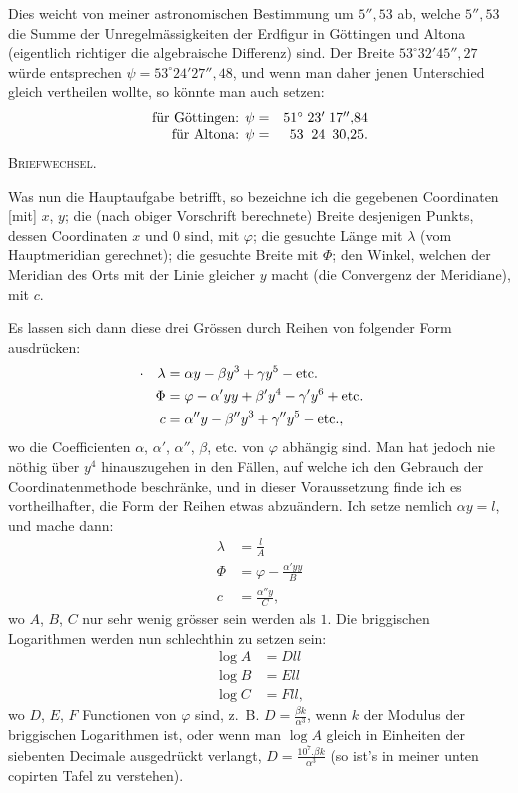 Dies weicht von meiner astronomischen Bestimmung um $5''{,}53$ ab, welche $5''{,}53$ die Summe der Unregelmässigkeiten der Erdfigur in Göttingen und Altona (eigentlich richtiger die algebraische Differenz) sind. Der Breite $53^\circ32'45''{,}27$ würde entsprechen $\psi=53^\circ24'27''{,}48$, und wenn man daher jenen Unterschied gleich vertheilen wollte, so könnte man auch setzen:
\[
\begin{array}{r@{\quad}r@{\;}r@{\;}r}
\text{für Göttingen: }\psi=&51^\circ&23'&17''{,}84\\
\text{für Altona: }\psi=&53&24&30{,}25.
\end{array}
\]
\clearpage
{}\hfill\textsc{Briefwechsel.}\hfill\mbox{}\par\medskip
Was nun die Hauptaufgabe betrifft, so bezeichne ich die gegebenen Coordinaten [mit] $x$, $y$; die (nach obiger Vorschrift berechnete) Breite desjenigen Punkts, dessen Coordinaten $x$ und $0$ sind, mit $\varphi$; die gesuchte Länge mit $\lambda$ (vom Hauptmeridian gerechnet); die gesuchte Breite mit $\Phi$; den Winkel, welchen der Meridian des Orts mit der Linie gleicher $y$ macht (die Convergenz der Meridiane), mit $c$.

Es lassen sich dann diese drei Grössen durch Reihen von folgender Form ausdrücken:
\[
\begin{aligned}
\llap{\text{\raisebox{.45ex}{.}\hspace{1em}}}\lambda&=\alpha y-\beta y^3+\gamma y^5-\text{etc.}\\
\Phi&=\varphi-\alpha'yy+\beta'y^4-\gamma'y^6+\text{etc.}\\
c&=\alpha''y-\beta''y^3+\gamma''y^5-\text{etc.},
\end{aligned}
\]
wo die Coefficienten $\alpha$, $\alpha'$, $\alpha''$, $\beta$, etc. von $\varphi$ abhängig sind. Man hat jedoch nie nöthig über $y^4$ hinauszugehen in den Fällen, auf welche ich den Gebrauch der Coordinatenmethode beschränke, und in dieser Voraussetzung finde ich es vortheilhafter, die Form der Reihen etwas abzuändern. Ich setze nemlich $\alpha y=l$, und mache dann:
\[
\begin{aligned}
\lambda&=\frac lA\\
\Phi&=\varphi-\frac{\alpha'yy}{B}\\
c&=\frac{\alpha''y}{C},
\end{aligned}
\]
wo $A$, $B$, $C$ nur sehr wenig grösser sein werden als $1$. Die briggischen Logarithmen werden nun schlechthin zu setzen sein:
\[
\begin{aligned}
\log A&=Dll\\
\log B&=Ell\\
\log C&=Fll,
\end{aligned}
\]
wo $D$, $E$, $F$ Functionen von $\varphi$ sind, z.~B. $D=\frac{\beta k}{\alpha^3}$, wenn $k$ der Modulus der briggischen Logarithmen ist, oder wenn man $\log A$ gleich in Einheiten der siebenten Decimale ausgedrückt verlangt, $D=\frac{10^7.\beta k}{\alpha^3}$ (so ist's in meiner unten copirten Tafel zu verstehen).


